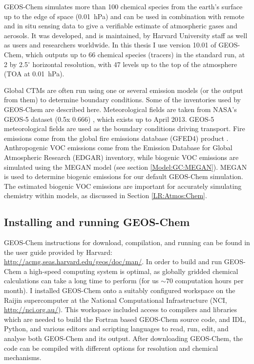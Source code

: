     GEOS-Chem simulates more than 100 chemical species from the earth's surface up to the edge of space (0.01~hPa) and can be used in combination with remote and in situ sensing data to give a verifiable estimate of atmospheric gases and aerosols.
    It was developed, and is maintained, by Harvard University staff as well as users and researchers worldwide.
    In this thesis I use version 10.01 of GEOS-Chem, which outputs up to 66 chemical species (tracers) in the standard run, at 2 by 2.5$^{\circ}$ horizontal resolution, with 47 levels up to the top of the atmosphere (TOA at 0.01~hPa). 
    
    
    Global CTMs are often run using one or several emission models (or the output from them) to determine boundary conditions.
    Some of the inventories used by GEOS-Chem are described here.
    Meteorological fields are taken from NASA's GEOS-5 dataset (0.5\degr x 0.666\degr) \parencite{Chen2009}, which exists up to April 2013.
    GEOS-5 meteorological fields are used as the boundary conditions driving transport.
    Fire emissions come from the global fire emissions database (GFED4) product \parencite{Giglio2013}. 
    Anthropogenic VOC emissions come from the Emission Database for Global Atmospheric Research (EDGAR) inventory, while biogenic VOC emissions are simulated using the MEGAN model (see section \ref{Model:GC:MEGAN}).
    MEGAN is used to determine biogenic emissions for our default GEOS-Chem simulation.
    The estimated biogenic VOC emissions are important for accurately simulating chemistry within models, as discussed in Section \ref{LR:Atmos:Chem}.
    
  
  \subsection{Installing and running GEOS-Chem}
    \label{Model:GC:running}
    GEOS-Chem instructions for download, compilation, and running can be found in the user guide provided by Harvard: \url{http://acmg.seas.harvard.edu/geos/doc/man/}.
    In order to build and run GEOS-Chem a high-speed computing system is optimal, as globally gridded chemical calculations can take a long time to perform (for us $\sim 70$ computation hours per month).
    I installed GEOS-Chem onto a suitably configured workspace on the Raijin supercomputer at the National Computational Infrastructure (NCI, \url{http://nci.org.au/}).
    This workspace included access to compilers and libraries which are needed to build the Fortran based GEOS-Chem source code, and IDL, Python, and various editors and scripting languages to read, run, edit, and analyse both GEOS-Chem and its output.
    After downloading GEOS-Chem, the code can be compiled with different options for resolution and chemical mechanisms.
  
